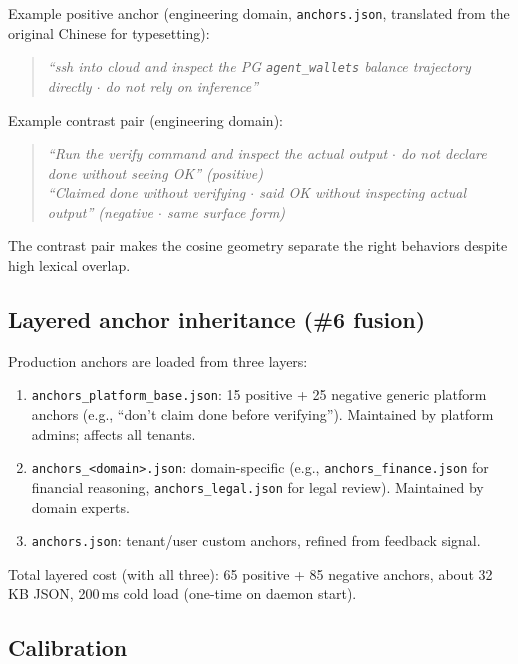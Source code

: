 Example positive anchor (engineering domain, \texttt{anchors.json},
translated from the original Chinese for typesetting):
\begin{quote}\itshape
  ``ssh into cloud and inspect the PG \texttt{agent\_wallets} balance
  trajectory directly $\cdot$ do not rely on inference''
\end{quote}

Example contrast pair (engineering domain):
\begin{quote}\itshape
  ``Run the verify command and inspect the actual output $\cdot$ do not
  declare done without seeing OK'' \emph{(positive)}\\
  ``Claimed done without verifying $\cdot$ said OK without inspecting
  actual output'' \emph{(negative $\cdot$ same surface form)}
\end{quote}

The contrast pair makes the cosine geometry separate the right
behaviors despite high lexical overlap.

\subsection{Layered anchor inheritance (\#6 fusion)}

Production anchors are loaded from three layers:

\begin{enumerate}
\item \texttt{anchors\_platform\_base.json}: 15 positive + 25 negative
  generic platform anchors (e.g., ``don't claim done before
  verifying''). Maintained by \compass{} platform admins; affects all tenants.

\item \texttt{anchors\_<domain>.json}: domain-specific (e.g.,
  \texttt{anchors\_finance.json} for financial reasoning, \texttt{anchors\_legal.json}
  for legal review). Maintained by domain experts.

\item \texttt{anchors.json}: tenant/user custom anchors, refined from
  feedback signal.
\end{enumerate}

Total layered cost (with all three): 65 positive + 85 negative anchors,
about 32\,KB JSON, 200\,ms cold load (one-time on daemon start).

\subsection{Calibration}
\label{app:calib}

